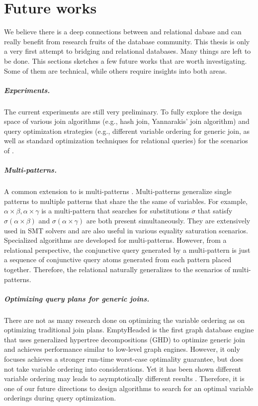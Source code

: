 \chapter{Future works}
\label{sec:future}
We believe there is a deep connections between \egraphs and relational dabase and \egraph can really benefit from research fruits of the database community. This thesis is only a very first attempt to bridging \egraphs and relational databases. Many things are left to be done. This sections sketches a few future works that are worth investigating. Some of them are technical, while others require insights into both areas.

\paragraph{Experiments.}
The current experiments are still very preliminary. To fully explore the design space of various join algorithms (e.g., hash join, Yannarakis' join algorithm) and query optimization strategies (e.g., different variable ordering for generic join, as well as standard optimization techniques for relational queries) for the scenarios of \ematching.

\paragraph{Multi-patterns.} A common extension to \ematching is multi-patterns \citep{efficient-ematching}. Multi-patterns generalize single patterns to multiple patterns that share the the same of variables. For example, $\alpha \times \beta, \alpha\times \gamma$ is a multi-pattern that searches for substitutions $\sigma$ that satisfy $\sigma(\alpha\times\beta)$ and $\sigma(\alpha\times\gamma)$ are both present simultaneously. They are extensively used in SMT solvers and are also useful in various equality saturation scenarios. Specialized algorithms are developed for multi-patterns. However, from a relational perspective, the conjunctive query generated by a multi-pattern is just a sequence of conjunctive query atoms generated from each pattern placed together. Therefore, the relational \ematching naturally generalizes to the scenarios of multi-patterns.

\paragraph{Optimizing query plans for generic joins.} There are not as many research done on optimizing the variable ordering as on optimizing traditional join plans. EmptyHeaded is the first graph database engine that uses generalized hypertree decompositions (GHD) to optimize generic join and achieves performance similar to low-level graph engines. However, it only focuses achieves a stronger run-time worst-case optimality guarantee, but does not take variable ordering into considerations. Yet it has been shown different variable ordering may leads to asymptotically different results \citep{eval-wcoj}. Therefore, it is one of our future directions to design algorithms to search for an optimal variable orderings during query optimization.

